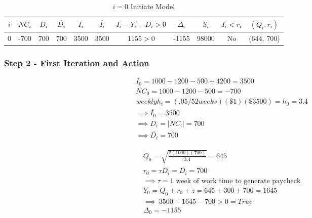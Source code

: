 \documentclass{article}
\begin{document}
\begin{table}
	\caption{$i = 0$ Initiate Model}
	\centering
	\begin{tabular}{||c|c|c|c|c|c|c|c|c|c|c||}
		\toprule
		$i$     & $NC_{i}$     & $D_{i}$ &  $\overline{D_{i}}$ & $I_{i}$ &  $\overline{I_{i}}$ & $I_{i}  - Y_{i} - D_{i} > 0$ & $\Delta_{i}$ & $S_{i}$ & $I_{i} < r_{i}$ & $(Q_{i}, r_{i})$\\
		\midrule
		0	& -700	&  700  	& 700  		& 3500	& 3500		& $1155 > 0$		 & -1155		& 98000 	&	No 	& (644, 700) \\
		\bottomrule
	\end{tabular}
	\label{tab:table}
\end{table}
\FloatBarrier

\subsubsection{Step 2 - First Iteration and Action}

\begin{equation}
	\begin{split}
		I_{0} = 1000 - 1200 -500 + 4200 = 3500\\
		NC_{0} = 1000 - 1200 - 500 = -700\\
		weekly h_{i} = (.05/52 weeks)(\$1)(\$3500) = h_{0} = 3.4 \\
		\implies \overline{I_{0}} =  3500 \\
		\implies D_{i} = |NC_{i}|  = 700 \\
		\implies \overline{D_{i}} = 700 
	\end{split}
\end{equation}

\begin{equation}
	\begin{split}
		Q_{0} =  \sqrt{\frac{2(1000)(700)}{3.4}} = 645\\
		r_{0} =  \tau\overline{D_{i}} = \overline{D_{i}} = 700\\
		\implies \tau = \text{1 week of work time to generate paycheck}\\
		Y_{0} = Q_{0} + r_{0} + z = 645 + 300 + 700 = 1645\\
		\implies \: 3500 - 1645 - 700 > 0  = True \\
		\Delta_{0} = -1155
	\end{split}
\end{equation}
\end{document}
